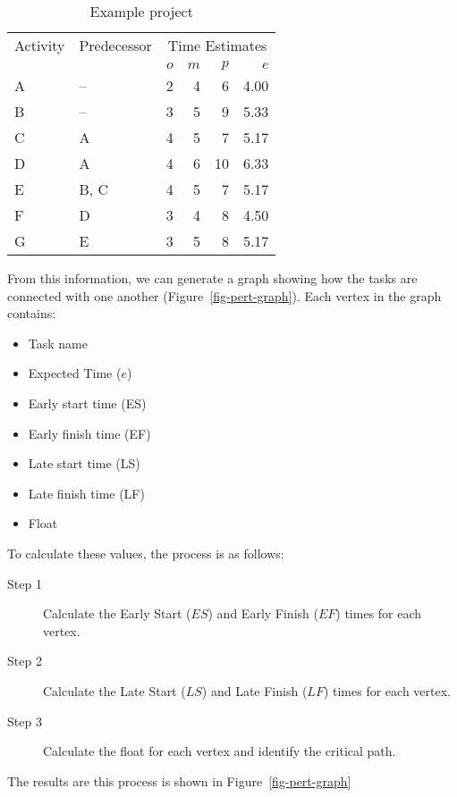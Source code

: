 \begin{table}[h!]
  \centering
  \begin{tabular}{l l r r r r}
  \toprule
    Activity & Predecessor & \multicolumn{4}{c}{Time Estimates} \\
    & & $o$ & $m$ & $p$ & $e$ \\
  \midrule
    A & -- & 2 & 4 & 6 & 4.00 \\
    B & -- & 3 & 5 & 9 & 5.33 \\
    C & A & 4 & 5 & 7 & 5.17 \\
    D & A & 4 & 6 & 10 & 6.33 \\
    E & B, C & 4 & 5 & 7 & 5.17 \\
    F & D & 3 & 4 & 8 & 4.50 \\
    G & E & 3 & 5 & 8 & 5.17 \\
  \bottomrule
  \end{tabular}
  \caption{Example project}\label{tbl-project}
\end{table}

From this information, we can generate a graph showing how the tasks are connected with one another (Figure~\ref{fig-pert-graph}). Each vertex in the graph contains:

\begin{itemize}
  \item Task name
  \item Expected Time ($e$)
  \item Early start time (ES)
  \item Early finish time (EF)
  \item Late start time (LS)
  \item Late finish time (LF)
  \item Float
\end{itemize}

To calculate these values, the process is as follows:

\begin{description}
  \item[Step 1] Calculate the Early Start ($ES$) and Early Finish ($EF$) times for each vertex.
  \item[Step 2] Calculate the Late Start ($LS$) and Late Finish ($LF$) times for each vertex.
  \item[Step 3] Calculate the float for each vertex and identify the critical path.
\end{description}

The results are this process is shown in Figure~\ref{fig-pert-graph}

